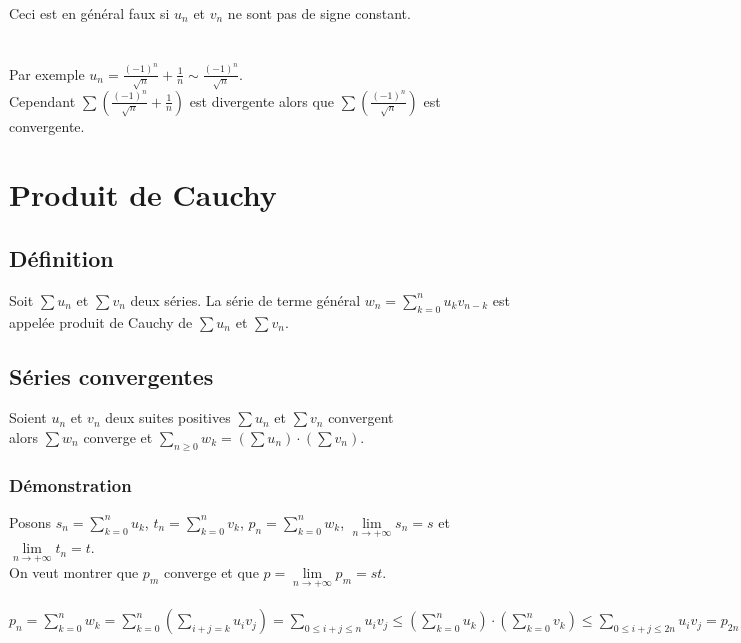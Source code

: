 \documentclass[a4paper,10pt]{book} %
\newcommand{\displayAmath}{\displaystyle}
\begin{document}
Ceci est en général faux si $u_n$ et $v_n$ ne sont pas de signe constant.\\\\\\
Par exemple $\displayAmath u_n=\frac{(-1)^n}{\sqrt{n}}+\frac{1}{n}\sim \frac{(-1)^n}{\sqrt{n}}$.\\

Cependant $\displayAmath\sum(\frac{(-1)^n}{\sqrt{n}}+\frac{1}{n})$ est divergente alors que $\displayAmath\sum (\frac{(-1)^n}{\sqrt{n}})$ est convergente.

\newpage

\section{Produit de Cauchy}
\subsection{Définition}
Soit $\sum u_n$ et $\sum v_n$ deux séries. La série de terme général $\displayAmath w_n=\sum_{k=0}^nu_kv_{n-k}$ est appelée produit de Cauchy de $\sum u_n$ et $\sum v_n$.

\subsection{Séries convergentes}\label{produit de Cauchy}
Soient $u_n$ et $v_n$ deux suites positives $\sum u_n$ et $\sum v_n$ convergent\\alors $\sum w_n$ converge et $\displayAmath\sum_{n\geq 0} w_k=(\sum u_n)\cdot (\sum v_n)$.

\subsubsection{Démonstration}
Posons $\displayAmath s_n=\sum_{k=0}^n u_k$, $\displayAmath t_n=\sum_{k=0}^n v_k$, $\displayAmath p_n=\sum_{k=0}^n w_k$, $\lim\limits_{n\rightarrow+\infty}s_n=s$ et $\lim\limits_{n\rightarrow+\infty}t_n=t$.\\

On veut montrer que $p_m$ converge et que $p=\lim\limits_{n\rightarrow+\infty} p_m=st$.\\\\
$\displayAmath p_n=\sum_{k=0}^n w_k=\sum_{k=0}^n (\sum_{i+j=k} u_iv_j)=\sum_{0\leq i+j\leq n}u_iv_j\leq (\sum_{k=0}^n u_k)\cdot (\sum_{k=0}^n v_k)\leq \sum_{0\leq i+j\leq 2n} u_iv_j=p_{2n}$\\
\end{document}
